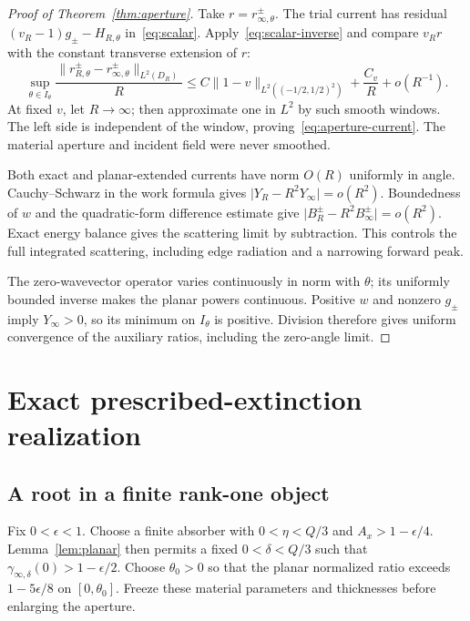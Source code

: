 \documentclass[11pt]{article}
\newcommand{\norm}[1]{\lVert #1\rVert}
\newcommand{\abs}[1]{\lvert #1\rvert}
\begin{document}
\begin{proof}[Proof of Theorem~\ref{thm:aperture}]
Take $r=r_{\infty,\theta}^\pm$. The trial current has residual $(v_R-1)g_\pm-H_{R,\theta}$ in~\eqref{eq:scalar}. Apply~\eqref{eq:scalar-inverse} and compare $v_Rr$ with the constant transverse extension of $r$:
\begin{equation}\label{eq:current-error}
 \sup_{\theta\in I_\theta}\frac{\norm{r_{R,\theta}^\pm-r_{\infty,\theta}^\pm}_{L^2(D_R)}}{R}
 \leq C\norm{1-v}_{L^2((-1/2,1/2)^2)}+\frac{C_v}{R}+o(R^{-1}).
\end{equation}
At fixed $v$, let $R\to\infty$; then approximate one in $L^2$ by such smooth windows. The left side is independent of the window, proving~\eqref{eq:aperture-current}. The material aperture and incident field were never smoothed.

Both exact and planar-extended currents have norm $O(R)$ uniformly in angle. Cauchy--Schwarz in the work formula gives $\abs{Y_R-R^2Y_\infty}=o(R^2)$. Boundedness of $w$ and the quadratic-form difference estimate give $\abs{B_R^\pm-R^2B_\infty^\pm}=o(R^2)$. Exact energy balance gives the scattering limit by subtraction. This controls the full integrated scattering, including edge radiation and a narrowing forward peak.

The zero-wavevector operator varies continuously in norm with $\theta$; its uniformly bounded inverse makes the planar powers continuous. Positive $w$ and nonzero $g_\pm$ imply $Y_\infty>0$, so its minimum on $I_\theta$ is positive. Division therefore gives uniform convergence of the auxiliary ratios, including the zero-angle limit.
\end{proof}

\section{Exact prescribed-extinction realization}\label{sec:realization}
\subsection{A root in a finite rank-one object}
Fix $0<\epsilon<1$. Choose a finite absorber with $0<\eta<Q/3$ and $A_x>1-\epsilon/4$. Lemma~\ref{lem:planar} then permits a fixed $0<\delta<Q/3$ such that $\gamma_{\infty,\delta}(0)>1-\epsilon/2$. Choose $\theta_0>0$ so that the planar normalized ratio exceeds $1-5\epsilon/8$ on $[0,\theta_0]$. Freeze these material parameters and thicknesses before enlarging the aperture.
\end{document}
